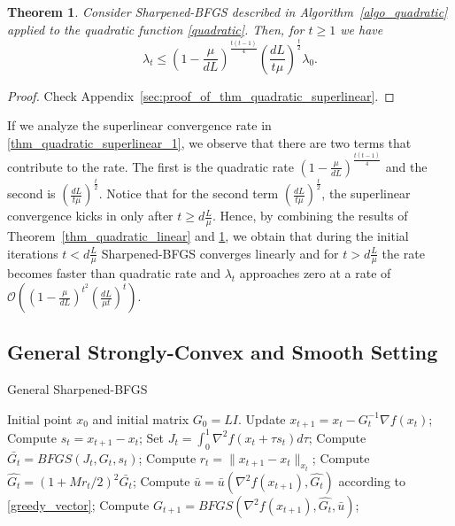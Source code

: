 \documentclass[11pt]{article}
\numberwithin{assumption}{section}
\numberwithin{remark}{section}
\newtheorem{theorem}{Theorem}
\numberwithin{theorem}{section}
\begin{document}
\begin{theorem}\label{thm_quadratic_superlinear}
Consider Sharpened-BFGS described in Algorithm~\ref{algo_quadratic} applied to the quadratic function \eqref{quadratic}. Then, for $t\geq 1$ we have
\begin{equation}\label{thm_quadratic_superlinear_1}
    \lambda_t \leq \left(1 - \frac{\mu}{dL}\right)^{\frac{t(t - 1)}{4}} \left(\frac{dL}{t\mu}\right)^{\frac{t}{2}}\lambda_0.
\end{equation}
\end{theorem}

\begin{proof}
Check Appendix~\ref{sec:proof_of_thm_quadratic_superlinear}.
\end{proof}

If we analyze the superlinear convergence rate in \eqref{thm_quadratic_superlinear_1}, we observe that there are two terms that contribute to the  rate. The first is the quadratic rate $(1 - \frac{\mu}{dL})^{\frac{t(t - 1)}{4}}$ and the second is $(\frac{dL}{t\mu})^{\frac{t}{2}}$. Notice that for the second term $(\frac{dL}{t\mu})^{\frac{t}{2}}$, the superlinear convergence kicks in only after $t \geq d\frac{L}{\mu}$. Hence, by combining the results of Theorem~\ref{thm_quadratic_linear} and \ref{thm_quadratic_superlinear}, we obtain that during the initial iterations $t<d\frac{L}{\mu}$ Sharpened-BFGS converges linearly and for $t>d\frac{L}{\mu}$ the rate becomes faster than quadratic rate and $\lambda_t$ approaches zero at a rate of  $\mathcal{O}((1-\frac{\mu}{dL})^{t^2} (\frac{dL}{\mu t})^t)$.

\subsection{General Strongly-Convex and Smooth Setting}\label{sec:general}

\begin{algorithm}[t]
\caption{General Sharpened-BFGS }\label{algo_general} 
\begin{algorithmic}[1] 
{\REQUIRE Initial point $x_0$ and initial matrix $G_0 = LI$.
    \STATE Update $x_{t + 1} = x_t - G_t^{-1} \nabla{f(x_t)}$;
    \STATE Compute  $s_t = x_{t + 1} - x_t$;
    \STATE Set  $J_t = \int_{0}^{1}\nabla^2{f(x_t + \tau s_t)}d\tau$;
    \STATE Compute $\bar{G_t} = BFGS(J_t, G_t, s_t)$;
    \STATE Compute $r_t = \|x_{t + 1} - x_{t}\|_{x_t}$;
    \STATE Compute  $\hat{G_t} = (1 + {Mr_t}/{2})^2\bar{G_t}$;
    \STATE Compute  $\bar{u} = \bar{u}(\nabla^2{f(x_{t + 1})}, \hat{G_t})$ according to \eqref{greedy_vector};
    \STATE Compute $G_{t + 1} = BFGS(\nabla^2{f(x_{t + 1})}, \hat{G_t}, \bar{u})$;
\ENDFOR}
\end{algorithmic}\end{algorithm}
\end{document}
